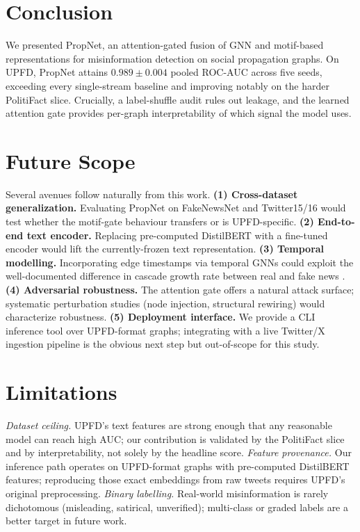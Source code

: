 \documentclass[conference]{IEEEtran}
\begin{document}
\section{Conclusion}
We presented PropNet, an attention-gated fusion of GNN and motif-based representations for misinformation detection on social propagation graphs. On UPFD, PropNet attains $0.989{\pm}0.004$ pooled ROC-AUC across five seeds, exceeding every single-stream baseline and improving notably on the harder PolitiFact slice. Crucially, a label-shuffle audit rules out leakage, and the learned attention gate provides per-graph interpretability of which signal the model uses.

\section{Future Scope}
Several avenues follow naturally from this work.
\textbf{(1) Cross-dataset generalization.} Evaluating PropNet on FakeNewsNet \cite{shu2020fakenewsnet} and Twitter15/16 \cite{ma2017detect} would test whether the motif-gate behaviour transfers or is UPFD-specific.
\textbf{(2) End-to-end text encoder.} Replacing pre-computed DistilBERT with a fine-tuned encoder would lift the currently-frozen text representation.
\textbf{(3) Temporal modelling.} Incorporating edge timestamps via temporal GNNs could exploit the well-documented difference in cascade growth rate between real and fake news \cite{vosoughi2018spread}.
\textbf{(4) Adversarial robustness.} The attention gate offers a natural attack surface; systematic perturbation studies (node injection, structural rewiring) would characterize robustness.
\textbf{(5) Deployment interface.} We provide a CLI inference tool over UPFD-format graphs; integrating with a live Twitter/X ingestion pipeline is the obvious next step but out-of-scope for this study.

\section*{Limitations}
\emph{Dataset ceiling.} UPFD's text features are strong enough that any reasonable model can reach high AUC; our contribution is validated by the PolitiFact slice and by interpretability, not solely by the headline score.
\emph{Feature provenance.} Our inference path operates on UPFD-format graphs with pre-computed DistilBERT features; reproducing those exact embeddings from raw tweets requires UPFD's original preprocessing.
\emph{Binary labelling.} Real-world misinformation is rarely dichotomous (misleading, satirical, unverified); multi-class or graded labels are a better target in future work.



\end{document}
